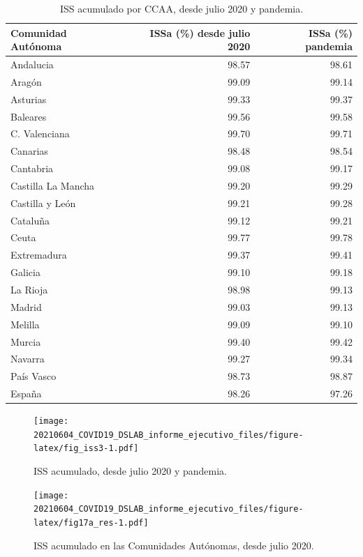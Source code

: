 \documentclass[
  11pt,
]{article}
\begin{document}
\begin{table}[!h]

\caption{\label{tab:tabla}ISS acumulado por CCAA, desde julio 2020 y pandemia.}
\centering
\fontsize{9}{11}\selectfont
\begin{tabular}[t]{l|r|r}
\hline
Comunidad Autónoma & ISSa (\%) desde julio 2020 & ISSa (\%) pandemia\\
\hline
Andalucia & 98.57 & 98.61\\
\hline
Aragón & 99.09 & 99.14\\
\hline
Asturias & 99.33 & 99.37\\
\hline
Baleares & 99.56 & 99.58\\
\hline
C. Valenciana & 99.70 & 99.71\\
\hline
Canarias & 98.48 & 98.54\\
\hline
Cantabria & 99.08 & 99.17\\
\hline
Castilla La Mancha & 99.20 & 99.29\\
\hline
Castilla y León & 99.21 & 99.28\\
\hline
Cataluña & 99.12 & 99.21\\
\hline
Ceuta & 99.77 & 99.78\\
\hline
Extremadura & 99.37 & 99.41\\
\hline
Galicia & 99.10 & 99.18\\
\hline
La Rioja & 98.98 & 99.13\\
\hline
Madrid & 99.03 & 99.13\\
\hline
Melilla & 99.09 & 99.10\\
\hline
Murcia & 99.40 & 99.42\\
\hline
Navarra & 99.27 & 99.34\\
\hline
País Vasco & 98.73 & 98.87\\
\hline
España & 98.26 & 97.26\\
\hline
\end{tabular}
\end{table}

\begin{figure}
\centering
\texttt{[image: 20210604\_COVID19\_DSLAB\_informe\_ejecutivo\_files/figure-latex/fig\_iss3-1.pdf]}
\caption{\label{fig:fig_iss3} ISS acumulado, desde julio 2020 y
pandemia.}
\end{figure}

\vspace{0.2cm}

\begin{figure}
\centering
\texttt{[image: 20210604\_COVID19\_DSLAB\_informe\_ejecutivo\_files/figure-latex/fig17a\_res-1.pdf]}
\caption{\label{fig:fig17a_res} ISS acumulado en las Comunidades
Autónomas, desde julio 2020.}
\end{figure}
\end{document}

